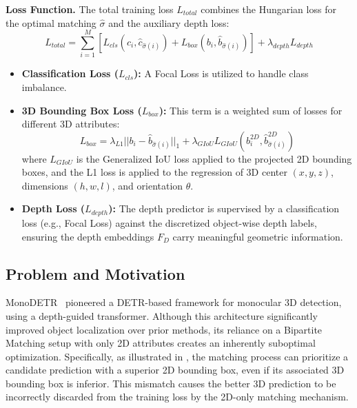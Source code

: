 \noindent\textbf{Loss Function.}
The total training loss $L_{total}$ combines the Hungarian loss for the optimal matching $\hat{\sigma}$ and the auxiliary depth loss:
\begin{equation}
    L_{total} = \sum_{i=1}^{M} \left[ L_{cls}(c_i, \hat{c}_{\hat{\sigma}(i)}) + L_{box}(b_i, \hat{b}_{\hat{\sigma}(i)}) \right] + \lambda_{depth} L_{depth}
\end{equation}

\begin{itemize}
    \item \textbf{Classification Loss ($L_{cls}$):} A Focal Loss is utilized to handle class imbalance.
    \item \textbf{3D Bounding Box Loss ($L_{box}$):} This term is a weighted sum of losses for different 3D attributes:
    \begin{equation}
        L_{box} = \lambda_{L1} ||b_i - \hat{b}_{\hat{\sigma}(i)}||_1 + \lambda_{GIoU} L_{GIoU}(b^{2D}_i, \hat{b}^{2D}_{\hat{\sigma}(i)})
    \end{equation}
    where $L_{GIoU}$ is the Generalized IoU loss applied to the projected 2D bounding boxes, and the L1 loss is applied to the regression of 3D center $(x, y, z)$, dimensions $(h, w, l)$, and orientation $\theta$.
    \item \textbf{Depth Loss ($L_{depth}$):} The depth predictor is supervised by a classification loss (e.g., Focal Loss) against the discretized object-wise depth labels, ensuring the depth embeddings $F_D$ carry meaningful geometric information.
\end{itemize}

\subsection{Problem and Motivation}
MonoDETR~\cite{MonoDETR} pioneered a DETR-based framework for monocular 3D detection, using a depth-guided transformer. Although this architecture significantly improved object localization over prior methods, its reliance on a Bipartite Matching setup with only 2D attributes creates an inherently suboptimal optimization. Specifically, as illustrated in , the matching process can prioritize a candidate prediction with a superior 2D bounding box, even if its associated 3D bounding box is inferior. This mismatch causes the better 3D prediction to be incorrectly discarded from the training loss by the 2D-only matching mechanism.


